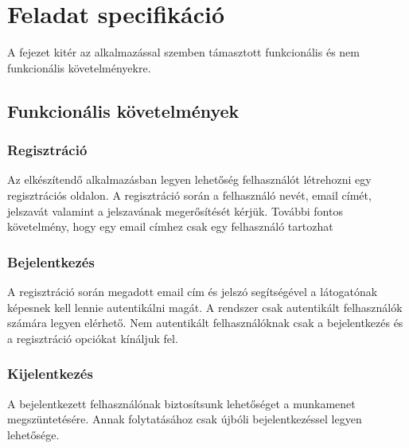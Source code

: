 \chapter{Feladat specifikáció}

A fejezet kitér az alkalmazással szemben támasztott funkcionális és nem funkcionális követelményekre.

\section{Funkcionális követelmények}

\subsection{Regisztráció}
Az elkészítendő alkalmazásban legyen lehetőség felhasználót létrehozni egy regisztrációs oldalon.
A regisztráció során a felhasználó nevét, email címét, jelszavát valamint a jelszavának megerősítését kérjük.
További fontos követelmény, hogy egy email címhez csak egy felhasználó tartozhat

\subsection{Bejelentkezés}
A regisztráció során megadott email cím és jelszó segítségével a látogatónak képesnek kell lennie autentikálni magát.
A rendszer csak autentikált felhasználók számára legyen elérhető.
Nem autentikált felhasználóknak csak a bejelentkezés és a regisztráció opciókat kínáljuk fel.

\subsection{Kijelentkezés}
A bejelentkezett felhasználónak biztosítsunk lehetőséget a munkamenet megszüntetésére. 
Annak folytatásához csak újbóli bejelentkezéssel legyen lehetősége.

